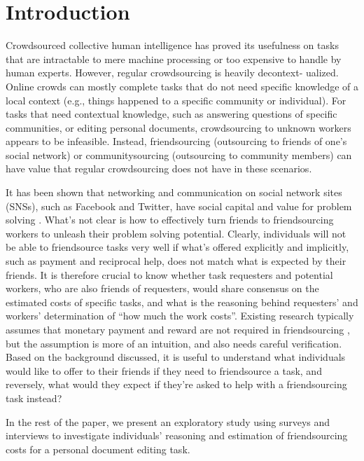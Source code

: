 \section{Introduction}

Crowdsourced collective human intelligence has proved its usefulness on tasks 
that are intractable to mere machine processing or too expensive to handle by human experts. 
However, regular crowdsourcing is heavily decontext- ualized. 
Online crowds can mostly complete tasks that do not need specific knowledge of a local context 
(e.g., things happened to a specific community or individual). 
For tasks that need contextual knowledge, 
such as answering questions of specific communities, or editing personal documents, 
crowdsourcing to unknown workers appears to be infeasible. 
Instead, friendsourcing (outsourcing to friends of one's social network) \cite{Bernstein:TOCHI10:Collabio}
or communitysourcing (outsourcing to community members) \cite{Heimerl:CHI12:CommunitySourcing} 
can have value that regular crowdsourcing does not have in these scenarios.

It has been shown that networking and communication on social network sites (SNSs), such as Facebook and Twitter, 
have social capital and value for problem solving \cite{Gray:CSCW13:WhoWantsKnow}. 
What's not clear is how to effectively turn friends to friendsourcing workers to unleash their problem solving potential. 
Clearly, individuals will not be able to friendsource tasks very well if what's offered explicitly and implicitly, 
such as payment and reciprocal help, does not match what is expected by their friends. 
It is therefore crucial to know whether task requesters and potential workers, who are also friends of requesters, 
would share consensus on the estimated costs of specific tasks, 
and what is the reasoning behind requesters' and workers' determination of ``how much the work costs''. 
Existing research typically assumes that monetary payment and reward are not required in friendsourcing \cite{Brady:HCOMP14:Microvolunteering}, 
but the assumption is more of an intuition, and also needs careful verification. 
Based on the background discussed, 
it is useful to understand what individuals would like to offer to their friends if they need to friendsource a task, 
and reversely, what would they expect if they're asked to help with a friendsourcing task instead?

In the rest of the paper, 
we present an exploratory study using surveys and interviews to investigate individuals' reasoning and 
estimation of friendsourcing costs for a personal document editing task.



